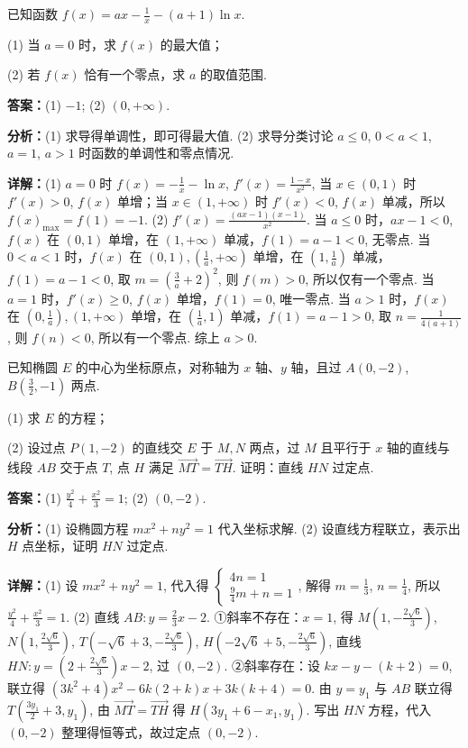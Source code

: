 \begin{question}[points=12]
已知函数 $f(x) = ax - \frac{1}{x} - (a+1)\ln x$.

(1) 当 $a=0$ 时，求 $f(x)$ 的最大值；

(2) 若 $f(x)$ 恰有一个零点，求 $a$ 的取值范围.
\begin{solution}
\textbf{答案：}(1) $-1$; (2) $(0, +\infty)$.

\textbf{分析：}(1) 求导得单调性，即可得最大值.
(2) 求导分类讨论 $a\le0$, $0<a<1$, $a=1$, $a>1$ 时函数的单调性和零点情况.

\textbf{详解：}(1) $a=0$ 时 $f(x)=-\frac1x-\ln x$, $f'(x)=\frac{1-x}{x^2}$, 当 $x\in(0,1)$ 时 $f'(x)>0$, $f(x)$ 单增；当 $x\in(1,+\infty)$ 时 $f'(x)<0$, $f(x)$ 单减，所以 $f(x)_{\max}=f(1)=-1$.
(2) $f'(x)=\frac{(ax-1)(x-1)}{x^2}$. 当 $a\le0$ 时，$ax-1<0$, $f(x)$ 在 $(0,1)$ 单增，在 $(1,+\infty)$ 单减，$f(1)=a-1<0$, 无零点. 当 $0<a<1$ 时，$f(x)$ 在 $(0,1), (\frac1a,+\infty)$ 单增，在 $(1,\frac1a)$ 单减，$f(1)=a-1<0$, 取 $m=(\frac3a+2)^2$, 则 $f(m)>0$, 所以仅有一个零点. 当 $a=1$ 时，$f'(x)\ge0$, $f(x)$ 单增，$f(1)=0$, 唯一零点. 当 $a>1$ 时，$f(x)$ 在 $(0,\frac1a), (1,+\infty)$ 单增，在 $(\frac1a,1)$ 单减，$f(1)=a-1>0$, 取 $n=\frac1{4(a+1)}$, 则 $f(n)<0$, 所以有一个零点. 综上 $a>0$.
\end{solution}
\end{question}

\begin{question}[points=12]
已知椭圆 $E$ 的中心为坐标原点，对称轴为 $x$ 轴、$y$ 轴，且过 $A(0,-2)$, $B(\frac32,-1)$ 两点.

(1) 求 $E$ 的方程；

(2) 设过点 $P(1,-2)$ 的直线交 $E$ 于 $M,N$ 两点，过 $M$ 且平行于 $x$ 轴的直线与线段 $AB$ 交于点 $T$, 点 $H$ 满足 $\overrightarrow{MT} = \overrightarrow{TH}$. 证明：直线 $HN$ 过定点.
\begin{solution}
\textbf{答案：}(1) $\frac{y^2}{4}+\frac{x^2}{3}=1$; (2) $(0,-2)$.

\textbf{分析：}(1) 设椭圆方程 $mx^2+ny^2=1$ 代入坐标求解.
(2) 设直线方程联立，表示出 $H$ 点坐标，证明 $HN$ 过定点.

\textbf{详解：}(1) 设 $mx^2+ny^2=1$, 代入得 $\begin{cases} 4n=1 \\ \frac94 m + n = 1 \end{cases}$, 解得 $m=\frac13$, $n=\frac14$, 所以 $\frac{y^2}{4}+\frac{x^2}{3}=1$.
(2) 直线 $AB: y=\frac23 x -2$. ①斜率不存在：$x=1$, 得 $M(1,-\frac{2\sqrt6}{3})$, $N(1,\frac{2\sqrt6}{3})$, $T(-\sqrt6+3,-\frac{2\sqrt6}{3})$, $H(-2\sqrt6+5,-\frac{2\sqrt6}{3})$, 直线 $HN: y=(2+\frac{2\sqrt6}{3})x-2$, 过 $(0,-2)$. ②斜率存在：设 $kx-y-(k+2)=0$, 联立得 $(3k^2+4)x^2-6k(2+k)x+3k(k+4)=0$. 由 $y=y_1$ 与 $AB$ 联立得 $T(\frac{3y_1}{2}+3, y_1)$, 由 $\overrightarrow{MT}=\overrightarrow{TH}$ 得 $H(3y_1+6-x_1, y_1)$. 写出 $HN$ 方程，代入 $(0,-2)$ 整理得恒等式，故过定点 $(0,-2)$.
\end{solution}
\end{question}

